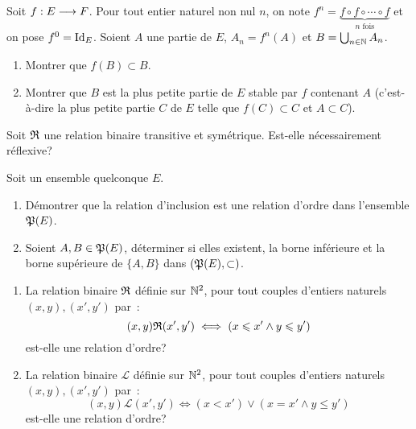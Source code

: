 \begin{exercice}
  Soit \(f:E \longrightarrow{} F\). Pour tout entier naturel non nul \(n\), on
  note \(f^n = \underbrace{f \circ f \circ \cdots \circ f}_{n \textrm{~fois}}\)
  et on pose \(f^0 = \operatorname{Id}_E\). Soient \(A\) une partie de \(E\), \(A_n
  = f^{n}(A)\) et \(B = \bigcup_{n\in{}\mathbb{N}} A_n\).
  \begin{enumerate}
    \item Montrer que \(f(B) \subset{}B\).
    \item Montrer que \(B\) est la plus petite partie de \(E\) stable par
      \(f\) contenant \(A\) (c'est-à-dire la plus petite partie \(C\) de
      \(E\) telle que \(f(C) \subset{}C\) et \(A \subset{}C\)).
  \end{enumerate}
\end{exercice}

\begin{exercice}
  Soit \(\mathfrak{R}\) une relation binaire transitive et symétrique. Est-elle
  nécessairement réflexive?
\end{exercice}

\begin{exercice}
  Soit un ensemble quelconque \(E\).
  \begin{enumerate}
    \item Démontrer que la relation d'inclusion est une relation d'ordre
      dans l'ensemble \(\mathfrak{P}(E)\).
    \item Soient \(A, B \in{}\mathfrak{P}(E)\), déterminer si elles existent, la
      borne inférieure et la borne supérieure de \(\{A, B\}\) dans
      \((\mathfrak{P}(E), \subset)\).
  \end{enumerate}
\end{exercice}

\begin{exercice}
  \begin{enumerate}
    \item La relation binaire \(\mathfrak{R}\) définie sur \(\mathbb{N}^2\), pour tout
      couples d'entiers naturels \((x, y), (x', y')\) par~:
      \[(x, y)\mathfrak{R}{}(x', y') \iff{}(x \leqslant x' \land y \leqslant y')\]
      est-elle une relation d'ordre?
    \item La relation binaire \(\mathcal{L}\) définie sur \(\mathbb{N}^2\), pour
      tout couples d'entiers naturels \((x, y), (x', y')\) par~:
      \[(x, y)\mathcal{L}(x', y') \iff{} (x < x') \lor (x = x' \land y
      \leqslant y')\] est-elle une relation d'ordre?
  \end{enumerate}
\end{exercice}

